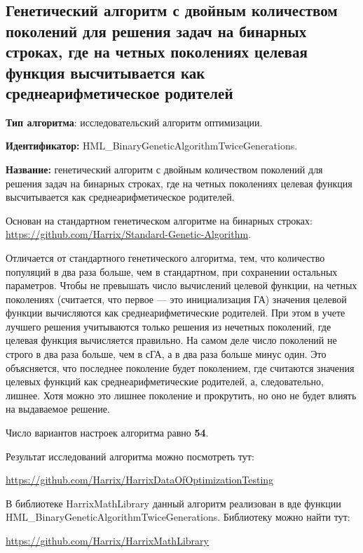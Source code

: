 \subsection{Генетический алгоритм с двойным количеством поколений для решения задач на бинарных строках, где на четных поколениях целевая функция высчитывается как среднеарифметическое родителей}\label{HarrixOptimizationAlgorithms:HML_BinaryGeneticAlgorithmTwiceGenerations}

\textbf{Тип алгоритма}: исследовательский алгоритм оптимизации.

\textbf{Идентификатор:} HML\_BinaryGeneticAlgorithmTwiceGenerations.

\textbf{Название:} генетический алгоритм с двойным количеством поколений для решения задач на бинарных строках, где на четных поколениях целевая функция высчитывается как среднеарифметическое родителей.

Основан на стандартном генетическом алгоритме на бинарных строках:  \href{https://github.com/Harrix/Standard-Genetic-Algorithm}{https://github.com/Harrix/Standard-Genetic-Algorithm}.

Отличается от стандартного генетического алгоритма, тем, что количество популяций в два раза больше, чем в стандартном, при сохранении остальных параметров. Чтобы не превышать число вычислений целевой функции, на четных поколениях (считается, что первое --- это инициализация ГА) значения целевой функции вычисляются как среднеарифметические родителей. При этом в учете лучшего решения учитываются только решения из нечетных поколений, где целевая функция вычисляется правильно. На самом деле число поколений не строго в два раза больше, чем в сГА, а в два раза больше минус один. Это объясняется, что последнее поколение будет поколением, где считаются значения целевых функций как среднеарифметические родителей, а, следовательно, лишнее. Хотя можно это лишнее поколение и прокрутить, но оно не будет влиять на выдаваемое решение.

Число вариантов настроек алгоритма равно \textbf{54}.

Результат исследований алгоритма можно посмотреть тут:

\href{https://github.com/Harrix/HarrixDataOfOptimizationTesting}{https://github.com/Harrix/HarrixDataOfOptimizationTesting}

В библиотеке HarrixMathLibrary данный алгоритм реализован в вде функции HML\_BinaryGeneticAlgorithmTwiceGenerations. Библиотеку можно найти тут:

\href{https://github.com/Harrix/HarrixMathLibrary}{https://github.com/Harrix/HarrixMathLibrary}